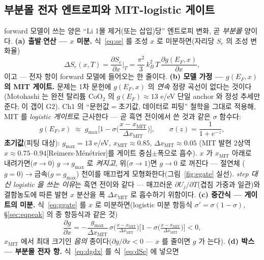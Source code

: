 \documentclass[11pt,a4paper]{article}
\newcommand{\MIT}{\mathrm{MIT}}
\begin{document}
\subsection{부분몰 전자 엔트로피와 MIT-logistic 게이트}\label{sub:mitgate}
forward 모델이 쓰는 양은 ``Li 1몰 제거(또는 삽입)당'' 엔트로피 변화, 곧 \emph{부분몰} 양이다. \textbf{(a) 출발$\cdot$연산
— $x$ 미분.} 식~\eqref{eq:se} 를 조성 $x$ 로 미분하면(자리당 $S_e$ 의 조성 변화율)
\begin{equation}
\Delta S_e(x,T)=\frac{\partial S_e}{\partial x}\bigg|_T
=\frac{\pi^2}{3}\,k_B^2\,T\,\frac{\partial g(E_F,x)}{\partial x},
\label{eq:dSe}
\end{equation}
이고 — 전자 항이 forward 모델에 들어오는 한 줄이다. \textbf{(b) 모델 가정 — $g(E_F,x)$ 의 MIT 게이트.} 문제는
1차 문헌에 $g(E_F,x)$ 의 \emph{연속} 정량 곡선이 없다는 것이다(Motohashi 는 완전 탈리튬 CoO$_2$ 의
$g(E_F)\approx13$ e/eV 단일 anchor 와 정성 추세만 준다; 이 갭이 G2). Ch1 의 ``문헌값$=$초기값, 데이터로 피팅'' 철학을
그대로 적용해, MIT 를 \emph{logistic 게이트}로 근사한다 — 곧 흑연 전이에서 쓴 것과 같은 $\sigma$ 함수다:
\begin{equation}
g(E_F,x)\;\approx\;g_{\max}\Big[1-\sigma\!\Big(\frac{x-x_\MIT}{\Delta x_\MIT}\Big)\Big],
\qquad \sigma(z)=\frac{1}{1+e^{-z}},
\label{eq:ggate}
\end{equation}
\textbf{초기값}(피팅 대상): $g_{\max}=13$ e/eV, $x_\MIT\approx0.85$, $\Delta x_\MIT\approx0.05$
(MIT 발현 2상역 $x\approx0.75$--$0.94$[Reimers\cite{reimers1992}$\cdot$Ménétrier\cite{menetrier1999}]를 게이트
중심$\pm$폭으로 흡수). $x$ 가 $x_\MIT$
아래로 내려가면($\sigma\to0$) $g\to g_{\max}$ 로 \emph{켜지고}, 위($\sigma\to1$)면 $g\to0$ 로 꺼진다 — 절연체
($g\!=\!0$)$\to$금속($g\!=\!g_{\max}$) 천이를 매끄럽게 모형화한다(그림~\ref{fig:egate} 실선). \emph{step 대신 logistic 을 쓰는 이유}는 흑연 전이와
같다 — 매끄러운 $\partial U_j/\partial T$(겹침 가중과 일관)와 결함농도에 따른 발현 $x$ 분산을 폭 $\Delta x_\MIT$ 로 흡수하기
위함이다. \textbf{(c) 중간식 — 게이트의 미분.} 식~\eqref{eq:ggate} 를 $x$ 로 미분하면(logistic 미분 항등식
$\sigma'=\sigma(1-\sigma)$, \S\ref{sec:eqpeak} 의 종 항등식과 같은 것)
\begin{equation}
\frac{\partial g}{\partial x}=-\frac{g_{\max}}{\Delta x_\MIT}\,
\sigma\!\Big(\tfrac{x-x_\MIT}{\Delta x_\MIT}\Big)\Big[1-\sigma\!\Big(\tfrac{x-x_\MIT}{\Delta x_\MIT}\Big)\Big]<0,
\label{eq:dgdx}
\end{equation}
$x_\MIT$ 에서 최대 크기인 \emph{음의} 종이다($\partial g/\partial x<0$ — $x$ 를 줄이면 $g$ 가 는다). \textbf{(d) 박스 —
부분몰 전자 항.} 식~\eqref{eq:dgdx} 를 식~\eqref{eq:dSe} 에 넣으면
\end{document}
